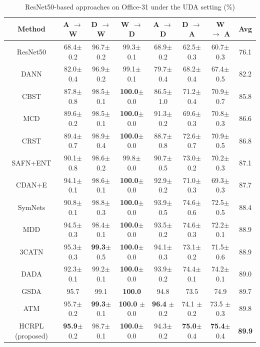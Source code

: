 \documentclass[a4paper,fleqn]{cas-dc}
\begin{document}
	
	\begin{center}
		\begin{table}
			\small
			\centering
			\caption{ResNet50-based approaches on Office-31  under the UDA setting (\%)}
			\begin{tabular*}{\hsize}{@{}@{\extracolsep{\fill}}cccccccc@{}}
				\toprule
				Method & A $\rightarrow$ W & D $\rightarrow$ W & W $\rightarrow$ D & A $\rightarrow$ D & D $\rightarrow$ A & W $\rightarrow$ A & Avg\\
				\midrule
				ResNet50 \cite{he2016deep} & 68.4$\pm$0.2 & 96.7$\pm$0.2 & 99.3$\pm$0.1 & 68.9$\pm$0.2 & 62.5$\pm$0.3 & 60.7$\pm$0.3 & 76.1\\
				DANN \cite{ganin2016domain}  &82.0$\pm$0.4 & 96.9$\pm$0.2 & 99.1$\pm$0.1 & 79.7$\pm$0.4 & 68.2$\pm$0.4 & 67.4$\pm$0.5 & 82.2\\
				CBST \cite{zou2018domain}  &87.8$\pm$0.8 & 98.5$\pm$0.1 & \textbf{100.0}$\pm$0.0 & 86.5$\pm$1.0 & 71.2$\pm$0.4 & 70.9$\pm$0.7 & 85.8\\
				MCD \cite{saito2018maximum}  & 89.6$\pm$0.2 & 98.5$\pm$0.1 & \textbf{100.0}$\pm$0.0 & 91.3$\pm$0.2 & 69.6$\pm$0.3 & 70.8$\pm$0.3 & 86.6\\
				CRST \cite{zou2019confidence}  &89.4$\pm$0.7 & 98.9$\pm$0.4 & \textbf{100.0}$\pm$0.0 & 88.7$\pm$0.8 & 72.6$\pm$0.7 & 70.9$\pm$0.5 & 86.8\\
				SAFN+ENT \cite{xu2019larger}  & 90.1$\pm$0.8 & 98.6$\pm$0.2 & 99.8$\pm$0.0 & 90.7$\pm$0.5 & 73.0$\pm$0.2 & 70.2$\pm$0.3 & 87.1\\
				CDAN+E \cite{long2018conditional}  & 94.1$\pm$0.1 & 98.6$\pm$0.1 & \textbf{100.0}$\pm$0.0 & 92.9$\pm$0.2 & 71.0$\pm$0.3 & 69.3$\pm$0.3 & 87.7\\
				SymNets \cite{zhang2019domain}  & 90.8$\pm$0.1 & 98.8$\pm$0.3 & \textbf{100.0}$\pm$0.0 & 93.9$\pm$0.5 & 74.6$\pm$0.6 & 72.5$\pm$0.5 & 88.4\\
				MDD \cite{zhang2019bridging}  & 94.5$\pm$0.3 & 98.4$\pm$0.1 & \textbf{100.0}$\pm$0.0 & 93.5$\pm$0.2 & 74.6$\pm$0.3 & 72.2$\pm$0.1 & 88.9\\
				3CATN \cite{li2019cycle} & 95.3$\pm$0.3 & \textbf{99.3}$\pm$0.5 & \textbf{100.0}$\pm$0.0 & 94.1$\pm$0.3 & 73.1$\pm$0.2 & 71.5$\pm$0.6 & 88.9\\
				
				
				DADA \cite{tang2019discriminative}  &92.3$\pm$0.1 & 99.2$\pm$0.1 & \textbf{100.0}$\pm$0.0 & 93.9$\pm$0.2 & 74.4$\pm$0.1 & 74.2$\pm$0.1 & 89.0\\
				GSDA \cite{hu2020unsupervised} & 95.7 & 99.1 & \textbf{100.0} & 94.8 & 73.5 & 74.9 & 89.7\\
				ATM \cite{li2020maximum} & 95.7$\pm$0.2 & \textbf{99.3}$\pm$0.1 & \textbf{100.0} $\pm$ 0.0 & \textbf{96.4} $\pm$ 0.2 & 74.1 $\pm$ 0.2 & 73.5 $\pm$ 0.3 & 89.8\\
				\midrule
				HCRPL (proposed) & \textbf{95.9}$\pm$0.2 & 98.7$\pm$0.1 & \textbf{100.0}$\pm$0.0 & 94.3$\pm$0.2 & \textbf{75.0}$\pm$0.4 & \textbf{75.4}$\pm$0.4 & \textbf{89.9}\\
				\bottomrule
			\end{tabular*}
			\label{table2}
		\end{table}
	\end{center}
	
\end{document}
